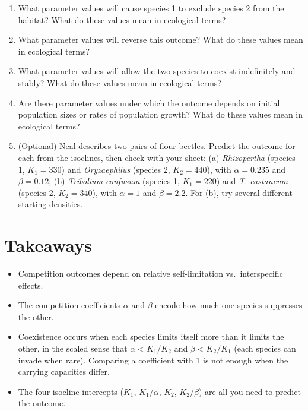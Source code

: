 \documentclass[
  a4paper]{book}
\providecommand{\tightlist}{%
  \setlength{\itemsep}{0pt}\setlength{\parskip}{0pt}}
\begin{document}
\begin{enumerate}
\def\labelenumi{\arabic{enumi}.}
\tightlist
\item
  What parameter values will cause species 1 to exclude species 2 from the habitat? What do these values mean in ecological terms?
\item
  What parameter values will reverse this outcome? What do these values mean in ecological terms?
\item
  What parameter values will allow the two species to coexist indefinitely and stably? What do these values mean in ecological terms?
\item
  Are there parameter values under which the outcome depends on initial population sizes or rates of population growth? What do these values mean in ecological terms?
\item
  (Optional) Neal describes two pairs of flour beetles. Predict the outcome for each from the isoclines, then check with your sheet: (a) \emph{Rhizopertha} (species 1, \(K_1 = 330\)) and \emph{Oryzaephilus} (species 2, \(K_2 = 440\)), with \(\alpha = 0.235\) and \(\beta = 0.12\); (b) \emph{Tribolium confusum} (species 1, \(K_1 = 220\)) and \emph{T. castaneum} (species 2, \(K_2 = 340\)), with \(\alpha = 1\) and \(\beta = 2.2\). For (b), try several different starting densities.
\end{enumerate}

\section{Takeaways}\label{takeaways-19}

\begin{itemize}
\tightlist
\item
  Competition outcomes depend on relative self-limitation vs.~interspecific effects.
\item
  The competition coefficients \(\alpha\) and \(\beta\) encode how much one species suppresses the other.
\item
  Coexistence occurs when each species limits itself more than it limits the other, in the scaled sense that \(\alpha < K_1/K_2\) and \(\beta < K_2/K_1\) (each species can invade when rare). Comparing a coefficient with 1 is not enough when the carrying capacities differ.
\item
  The four isocline intercepts (\(K_1\), \(K_1/\alpha\), \(K_2\), \(K_2/\beta\)) are all you need to predict the outcome.
\end{itemize}
\end{document}
